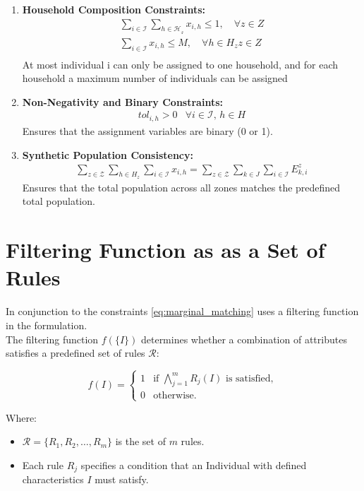 \begin{enumerate}[label=\textbf{C\arabic*}, ref=C\arabic*]
    \item \textbf{Household Composition Constraints:}
    \begin{align}
        \sum_{i \in \mathcal{I}}\sum_{h \in \mathcal{H_z}} x_{i,h} \leq 1, \quad \forall z \in Z\\
         \sum_{i \in \mathcal{I}} x_{i,h} \leq M, \quad \forall h \in H_z z \in Z\\
        \label{eq:household_composition}
    \end{align}
   At most individual i can only be assigned to one household, and for each household a maximum number of individuals can be assigned

    \item \textbf{Non-Negativity and Binary Constraints:}
    \begin{align}
        tol_{i,h} > 0 & \forall i \in \mathcal{I}, \, h \in H
        \label{eq:binary_constraints}
    \end{align}
    Ensures that the assignment variables are binary (0 or 1).

    \item \textbf{Synthetic Population Consistency:}
    \begin{align}
        \sum_{z \in \mathcal{Z}} \sum_{h \in H_z} \sum_{i \in \mathcal{I}} x_{i,h} =  \sum_{z \in \mathcal{Z}} \sum_{k \in J} \sum_{i \in \mathcal{I}}E^z_{k,i}
        \label{eq:population_consistency}
    \end{align}
    Ensures that the total population across all zones matches the predefined total population.


\end{enumerate}
\section*{Filtering Function as as a Set of Rules}
In conjunction to the constraints \cref{eq:marginal_matching} uses a filtering function in the formulation.\\

The filtering function \( f(\{I\}) \) determines whether a combination of attributes satisfies a predefined set of rules \( \mathcal{R} \):

\[
f(I) =
\begin{cases}
1 & \text{if } \bigwedge_{j=1}^{m} R_j{(I)} \text{ is satisfied}, \\
0 & \text{otherwise.}
\end{cases}
\]

Where:
\begin{itemize}
    \item \( \mathcal{R} = \{R_1, R_2, \dots, R_m\} \) is the set of \( m \) rules.
    \item Each rule \( R_j \) specifies a condition that an Individual with defined characteristics \( I\) must satisfy.
\end{itemize}



